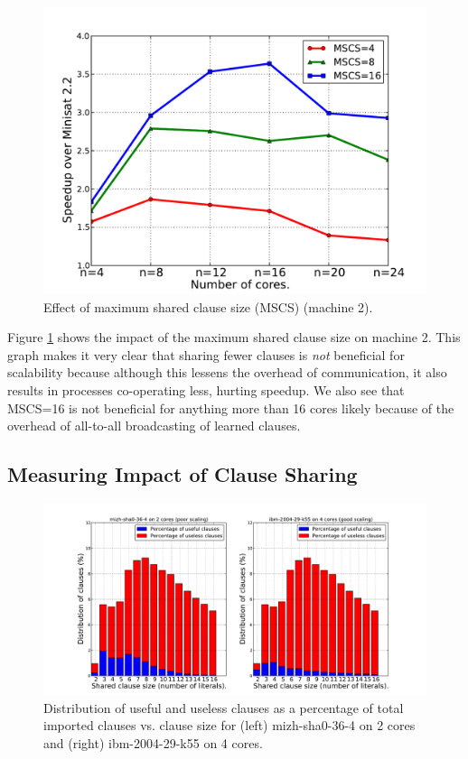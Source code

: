 \documentclass[letterpaper, compsoc, conference]{IEEEtran}
\begin{document}
\begin{figure}[htbp]
  \begin{center}
    \includegraphics[width=\columnwidth]{images/mcs2.pdf}
    \caption{Effect of maximum shared clause size (MSCS) (machine 2).}
    \label{fig:mscs2}
  \end{center}
\end{figure}

Figure \ref{fig:mscs2} shows the impact of the maximum shared clause size on
machine 2. This graph makes it very clear that sharing fewer clauses is
\emph{not} beneficial for scalability because although this lessens the overhead
of communication, it also results in processes co-operating less, hurting
speedup. We also see that MSCS=16 is not beneficial for anything more than 16
cores likely because of the overhead of all-to-all broadcasting of learned
clauses.

\subsection{Measuring Impact of Clause Sharing}

\begin{figure}[htbp]
    \includegraphics[width=2\columnwidth]{images/useful.pdf}
    \caption{Distribution of useful and useless clauses as a percentage of total
    imported clauses vs. clause size for (left) mizh-sha0-36-4 on 2 cores and
    (right) ibm-2004-29-k55 on 4 cores.}
    \label{fig:useful}
\end{figure}
\end{document}
